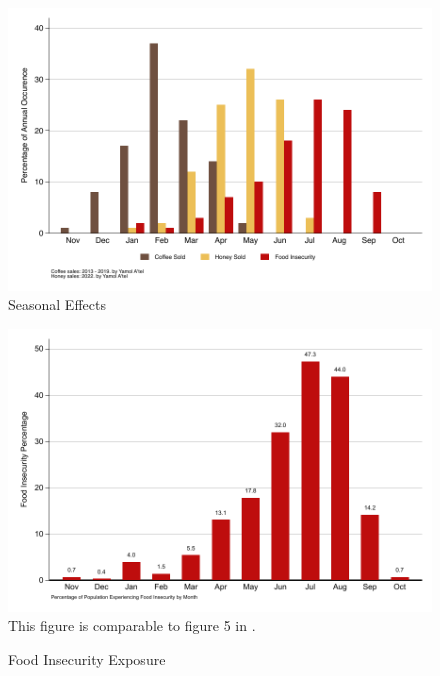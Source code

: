 \documentclass[../main.tex]{subfiles}
\begin{document}

\begin{figure}[h!]
    \centering
    \caption{Seasonal Effects}
    \label{fig:graph_seasonal_effects}   \includegraphics[width=1\textwidth]{project/figures/pdf/graph_seasonal_effects.pdf}
\end{figure}

\begin{figure}[h!]
    \centering
    \caption{Food Insecurity Exposure}
    \label{fig:graph_food_insecurity_exposure}    \includegraphics[width=1\textwidth]{project/figures/pdf/graph_food_insecurity_exposure.pdf}
    This figure is comparable to figure 5 in \textcite{anderzen_effects_2020}.
\end{figure}
\end{document}
